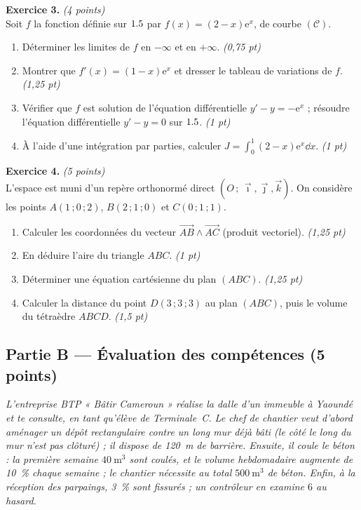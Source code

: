 \smallskip
\noindent\textbf{Exercice 3.} \hfill\textit{(4 points)}\\
Soit $f$ la fonction définie sur $1.5$ par $f(x)=(2-x)\mathrm{e}^{x}$, de courbe $(\mathcal{C})$.
\begin{enumerate}[label=\arabic*)]
\item Déterminer les limites de $f$ en $-\infty$ et en $+\infty$. \hfill\textit{(0,75 pt)}
\item Montrer que $f'(x)=(1-x)\mathrm{e}^{x}$ et dresser le tableau de variations de $f$. \hfill\textit{(1,25 pt)}
\item Vérifier que $f$ est solution de l'équation différentielle $y'-y=-\mathrm{e}^{x}$ ;
résoudre l'équation différentielle $y'-y=0$ sur $1.5$. \hfill\textit{(1 pt)}
\item À l'aide d'une intégration par parties, calculer $\displaystyle J=\int_0^{1}(2-x)\mathrm{e}^{x}\dd x$. \hfill\textit{(1 pt)}
\end{enumerate}

\smallskip
\noindent\textbf{Exercice 4.} \hfill\textit{(5 points)}\\
L'espace est muni d'un repère orthonormé direct $(O\,;\,\vec\imath,\vec\jmath,\vec k)$. On considère
les points $A(1\,;0\,;2)$, $B(2\,;1\,;0)$ et $C(0\,;1\,;1)$.
\begin{enumerate}[label=\arabic*)]
\item Calculer les coordonnées du vecteur $\vec{AB}\wedge\vec{AC}$ (produit vectoriel). \hfill\textit{(1,25 pt)}
\item En déduire l'aire du triangle $ABC$. \hfill\textit{(1 pt)}
\item Déterminer une équation cartésienne du plan $(ABC)$. \hfill\textit{(1,25 pt)}
\item Calculer la distance du point $D(3\,;3\,;3)$ au plan $(ABC)$, puis le volume du tétraèdre $ABCD$. \hfill\textit{(1,5 pt)}
\end{enumerate}

\subsection*{Partie B — Évaluation des compétences \hfill (5 points)}

\noindent\textit{L'entreprise BTP « Bâtir Cameroun » réalise la dalle d'un immeuble à Yaoundé et
te consulte, en tant qu'élève de Terminale~C. Le chef de chantier veut d'abord aménager un dépôt
\emph{rectangulaire} contre un long mur déjà bâti (le côté le long du mur n'est pas clôturé) ;
il dispose de \SI{120}{\metre} de barrière. Ensuite, il coule le béton : la première semaine
$\SI{40}{\cubic\metre}$ sont coulés, et le volume hebdomadaire augmente de \SI{10}{\percent}
chaque semaine ; le chantier nécessite au total $\SI{500}{\cubic\metre}$ de béton. Enfin, à la
réception des parpaings, \SI{3}{\percent} sont fissurés ; un contrôleur en examine $6$ au hasard.}

